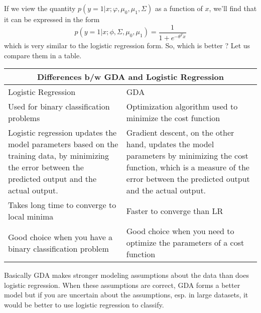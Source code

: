 \documentclass[a4paper,12pt,reqno]{amsart}
\begin{document}
If we view the quantity $p(y = 1|x; \varphi, \mu_0, \mu_1, \Sigma)$ as a function of $x$, we'll find that it can be expressed in the form
$$
p(y = 1|x; \phi, \Sigma, \mu_0, \mu_1) = \frac{1}{1 + e^{-\theta^T x}}
$$ which is very similar to the logistic regression form. So, which is better ? Let us compare them in a table. \newline \newline
\begin{tabular}{ |p{6cm}|p{6cm}|  }
\hline
\multicolumn{2}{|c|}{Differences b/w GDA and Logistic Regression} \\
\hline
Logistic Regression & GDA \\
\hline
Used for binary classification problems  & Optimization algorithm used to minimize the cost function  \\
Logistic regression updates the model parameters based on the training data, by minimizing the error between the predicted output and the actual output.   & Gradient descent, on the other hand, updates the model parameters by minimizing the cost function, which is a measure of the error between the predicted output and the actual output. \\
Takes long time to converge to local minima & Faster to converge than LR \\
Good choice when you have a binary classification problem & Good choice when you need to optimize the parameters of a cost function \\
\hline
\end{tabular}\newline\newline
Basically GDA makes stronger modeling assumptions about the data than does logistic regression. When these assumptions are correct, GDA forms a better model but if you are uncertain about the assumptions, esp. in large datasets, it would be better to use logistic regression to classify.



\end{document}
